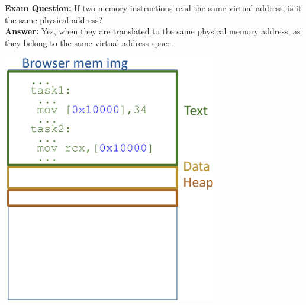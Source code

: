 \documentclass[../../compsys.tex]{subfiles}
\begin{document}
\noindent
\begin{minipage}{0.45\textwidth}
\textbf{Exam Question:} If two memory instructions read the same virtual address, is it the same physical address? \\[3px]
\textbf{Answer:} Yes, when they are translated to the same physical memory address, as they belong to the same virtual address space.
\end{minipage}%
\hfill
\vline
\hfill
\begin{minipage}{0.45\textwidth}
\begin{center}
    \includegraphics[width=0.7\textwidth]{chapters/L4/images/two-proc.png}
\end{center}
\end{minipage}
\\[10px]
\end{document}
